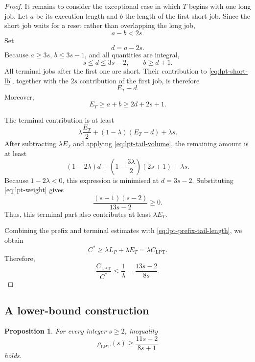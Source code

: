 \documentclass[11pt]{article}
\newtheorem{proposition}{Proposition}
\begin{document}
\begin{proof}
It remains to consider the exceptional case in which \(T\) begins with one
long job. Let \(a\) be its execution length and \(b\) the length of the first
short job. Since the short job waits for a reset rather than overlapping the
long job,
\[
a-b<2s.
\]
Set
\[
d=a-2s.
\]
Because \(a\ge3s\), \(b\le3s-1\), and all quantities are integral,
\begin{equation}
s\le d\le3s-2,
\qquad
b\ge d+1.
\label{eq:lpt-tail-d}
\end{equation}
All terminal jobs after the first one are short. Their contribution to
\eqref{eq:lpt-short-lb}, together with the \(2s\) contribution of the first
job, is therefore
\[
E_T-d.
\]
Moreover,
\begin{equation}
E_T\ge a+b\ge2d+2s+1.
\label{eq:lpt-tail-volume}
\end{equation}

The terminal contribution is at least
\[
\lambda\frac{E_T}{2}
+(1-\lambda)(E_T-d)
+\lambda s.
\]
After subtracting \(\lambda E_T\) and applying
\eqref{eq:lpt-tail-volume}, the remaining amount is at least
\[
(1-2\lambda)d
+
\left(1-\frac{3\lambda}{2}\right)(2s+1)
+\lambda s.
\]
Because \(1-2\lambda<0\), this expression is minimised at
\(d=3s-2\). Substituting \eqref{eq:lpt-weight} gives
\[
\frac{(s-1)(s-2)}{13s-2}\ge0.
\]
Thus, this terminal part also contributes at least \(\lambda E_T\).

Combining the prefix and terminal estimates with
\eqref{eq:lpt-prefix-tail-length}, we obtain
\[
C^*
\ge
\lambda L_P+\lambda E_T
=
\lambda C_{\mathrm{LPT}}.
\]
Therefore,
\[
\frac{C_{\mathrm{LPT}}}{C^*}
\le
\frac1\lambda
=
\frac{13s-2}{8s}.
\]
\end{proof}

\subsection{A lower-bound construction}
\label{subsec:lpt-lower-construction}

\begin{proposition}
\label{prop:lpt-lower}
For every integer \(s\ge2\), inequality 
\[
\rho_{\mathrm{LPT}}(s)
\ge
\frac{11s+2}{8s+1}
\]
holds.
\end{proposition}
\end{document}
